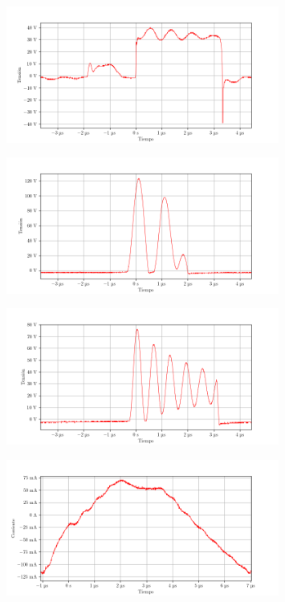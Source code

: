 \begin{figure}[ht]
    \centering
    \includegraphics[width=0.8\textwidth]{images/capturas-osciloscopio/17-11-2022/61.png}
    \caption{}
    \label{fig:osc:61}
\end{figure}

\begin{figure}[ht]
    \centering
    \includegraphics[width=0.8\textwidth]{images/capturas-osciloscopio/17-11-2022/62.png}
    \caption{}
    \label{fig:osc:62}
\end{figure}

\begin{figure}[ht]
    \centering
    \includegraphics[width=0.8\textwidth]{images/capturas-osciloscopio/17-11-2022/63.png}
    \caption{}
    \label{fig:osc:63}
\end{figure}

\begin{figure}[ht]
    \centering
    \includegraphics[width=0.8\textwidth]{images/capturas-osciloscopio/17-11-2022/64.png}
    \caption{}
    \label{fig:osc:64}
\end{figure}

